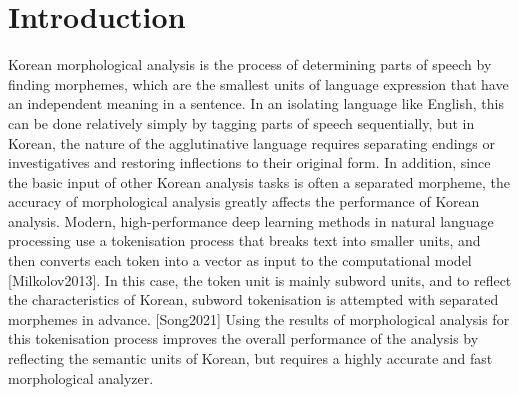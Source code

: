 \documentclass[AMS,STIX2COL]{WileyNJD-v2}
\begin{document}





    \maketitle



    \section{Introduction}\label{sec1}

    Korean morphological analysis is the process of determining parts of speech by finding morphemes, which are the smallest units of language expression that have an independent meaning in a sentence.
    In an isolating language like English, this can be done relatively simply by tagging parts of speech sequentially, but in Korean, the nature of the agglutinative language requires separating endings or investigatives and restoring inflections to their original form.
    In addition, since the basic input of other Korean analysis tasks is often a separated morpheme, the accuracy of morphological analysis greatly affects the performance of Korean analysis.
    Modern, high-performance deep learning methods in natural language processing use a tokenisation process that breaks text into smaller units, and then converts each token into a vector as input to the computational model [Milkolov2013].
    In this case, the token unit is mainly subword units, and to reflect the characteristics of Korean, subword tokenisation is attempted with separated morphemes in advance. [Song2021]
    Using the results of morphological analysis for this tokenisation process improves the overall performance of the analysis by reflecting the semantic units of Korean, but requires a highly accurate and fast morphological analyzer.
\end{document}
